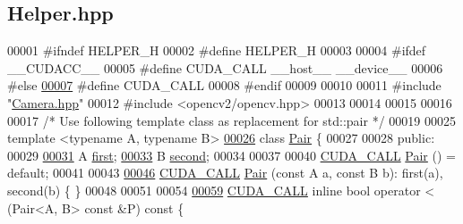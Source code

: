 \hypertarget{Helper_8hpp_source}{}\subsection{Helper.\+hpp}
\label{Helper_8hpp_source}

\begin{DoxyCode}
00001 \textcolor{preprocessor}{#ifndef HELPER\_H}
00002 \textcolor{preprocessor}{#define HELPER\_H}
00003 
00004 \textcolor{preprocessor}{#ifdef \_\_CUDACC\_\_}
00005 \textcolor{preprocessor}{#define CUDA\_CALL \_\_host\_\_ \_\_device\_\_}
00006 \textcolor{preprocessor}{#else}
\hypertarget{Helper_8hpp_source.tex_l00007}{}\hyperlink{Helper_8hpp_a0029886fd5e151820efb6eb46c000466}{00007} \textcolor{preprocessor}{#define CUDA\_CALL}
00008 \textcolor{preprocessor}{#endif}
00009 
00010 
00011 \textcolor{preprocessor}{#include "\hyperlink{Camera_8hpp}{Camera.hpp}"}
00012 \textcolor{preprocessor}{#include <opencv2/opencv.hpp>}
00013 
00014 
00015 
00016 
00017 \textcolor{comment}{/* Use following template class as replacement for std::pair */}
00019 
00025 \textcolor{keyword}{template} <\textcolor{keyword}{typename} A, \textcolor{keyword}{typename} B>
\hypertarget{Helper_8hpp_source.tex_l00026}{}\hyperlink{classPair}{00026} \textcolor{keyword}{class }\hyperlink{classPair}{Pair} \{
00027 
00028 \textcolor{keyword}{public}:
00029 
\hypertarget{Helper_8hpp_source.tex_l00031}{}\hyperlink{classPair_a98924311a2986df358d3b1965f8abd06}{00031}     A \hyperlink{classPair_a98924311a2986df358d3b1965f8abd06}{first};
\hypertarget{Helper_8hpp_source.tex_l00033}{}\hyperlink{classPair_af49ec2d61a46cad5cd1227dba4932aff}{00033}     B \hyperlink{classPair_af49ec2d61a46cad5cd1227dba4932aff}{second};
00034 
00037 
00040     \hyperlink{Helper_8hpp_a0029886fd5e151820efb6eb46c000466}{CUDA\_CALL} \hyperlink{classPair_ab76fff1f93ef8974bec7430bd67b916d}{Pair} () = \textcolor{keywordflow}{default};
00041 
00043 
\hypertarget{Helper_8hpp_source.tex_l00046}{}\hyperlink{classPair_addd8fa451e9cc9e1ab0ee13ccb130966}{00046}     \hyperlink{Helper_8hpp_a0029886fd5e151820efb6eb46c000466}{CUDA\_CALL} \hyperlink{classPair_addd8fa451e9cc9e1ab0ee13ccb130966}{Pair} (\textcolor{keyword}{const} A a, \textcolor{keyword}{const} B b): first(a), second(b) \{ \}
00048 
00051     
00054 
\hypertarget{Helper_8hpp_source.tex_l00059}{}\hyperlink{classPair_ab2e5000f2ce579285f773fafca762fb7}{00059}     \hyperlink{Helper_8hpp_a0029886fd5e151820efb6eb46c000466}{CUDA\_CALL} \textcolor{keyword}{inline} \textcolor{keywordtype}{bool} operator < (Pair<A, B> \textcolor{keyword}{const} &P) \textcolor{keyword}{const} \{

\end{DoxyCode}

